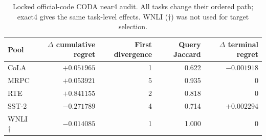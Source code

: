 \begin{table}[H]
\centering
\caption{Locked official-code CODA near4 audit. All tasks change their ordered path; exact4 gives the same task-level effects. WNLI ($\dagger$) was not used for target selection.}
\label{tab:coda}
\scriptsize
\setlength{\tabcolsep}{4pt}
\begin{tabular}{@{}lrrrr@{}}
\toprule
Pool & $\Delta$ cumulative regret & First divergence & Query Jaccard & $\Delta$ terminal regret \\
\midrule
CoLA       & $+0.051965$ & 1 & 0.622 & $-0.001918$ \\
MRPC       & $+0.053921$ & 5 & 0.935 & $0$ \\
RTE        & $+0.841155$ & 2 & 0.818 & $0$ \\
SST-2      & $-0.271789$ & 4 & 0.714 & $+0.002294$ \\
WNLI$\dagger$ & $-0.014085$ & 1 & 1.000 & $0$ \\
\bottomrule
\end{tabular}
\end{table}
